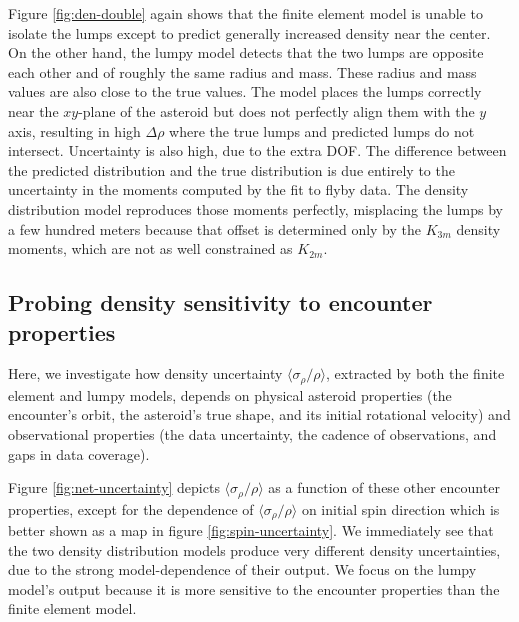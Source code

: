 \documentclass[fleqn,usenatbib]{mnras}
\begin{document}
Figure \ref{fig:den-double} again shows that the finite element model is unable to isolate the lumps except to predict generally increased density near the center. On the other hand, the lumpy model detects that the two lumps are opposite each other and of roughly the same radius and mass. These radius and mass values are also close to the true values. The model places the lumps correctly near the $xy$-plane of the asteroid but does not perfectly align them with the $y$ axis, resulting in high $\Delta \rho$ where the true lumps and predicted lumps do not intersect. Uncertainty is also high, due to the extra DOF. The difference between the predicted distribution and the true distribution is due entirely to the uncertainty in the moments computed by the fit to flyby data. The density distribution model reproduces those moments perfectly, misplacing the lumps by a few hundred meters because that offset is determined only by the $K_{3m}$ density moments, which are not as well constrained as $K_{2m}$.



\subsection{Probing density sensitivity to encounter properties}
\label{sec:density-uncertainty}

Here, we investigate how density uncertainty $\langle \sigma_\rho / \rho \rangle$, extracted by both the finite element and lumpy models, depends on physical asteroid properties (the encounter's orbit, the asteroid's true shape, and its initial rotational velocity) and observational properties (the data uncertainty, the cadence of observations, and gaps in data coverage).

Figure \ref{fig:net-uncertainty} depicts $\langle \sigma_\rho / \rho \rangle$ as a function of these other encounter properties, except for the dependence of $\langle \sigma_\rho / \rho \rangle$ on initial spin direction which is better shown as a map in figure \ref{fig:spin-uncertainty}. We immediately see that the two density distribution models produce very different density uncertainties, due to the strong model-dependence of their output. We focus on the lumpy model's output because it is more sensitive to the encounter properties than the finite element model. 
\end{document}
